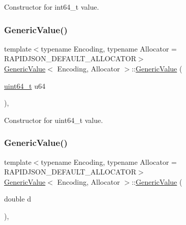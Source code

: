 Constructor for int64\+\_\+t value. 

\mbox{\label{classGenericValue_ad04805a57f5050c8e04be469ba64d6f3}} 
\subsubsection{\texorpdfstring{Generic\+Value()}{GenericValue()}\hspace{0.1cm}{\footnotesize\ttfamily [9/17]}}
{\footnotesize\ttfamily template$<$typename Encoding, typename Allocator = R\+A\+P\+I\+D\+J\+S\+O\+N\+\_\+\+D\+E\+F\+A\+U\+L\+T\+\_\+\+A\+L\+L\+O\+C\+A\+T\+OR$>$ \\
\hyperlink{classGenericValue}{Generic\+Value}$<$ Encoding, Allocator $>$\+::\hyperlink{classGenericValue}{Generic\+Value} (\begin{DoxyParamCaption}\item[{\hyperlink{stdint_8h_aec6fcb673ff035718c238c8c9d544c47}{uint64\+\_\+t}}]{u64 }\end{DoxyParamCaption})\hspace{0.3cm}{\ttfamily [inline]}, {\ttfamily [explicit]}}



Constructor for uint64\+\_\+t value. 

\mbox{\label{classGenericValue_a267d05b7e98c3507908eaf085fe41155}} 
\subsubsection{\texorpdfstring{Generic\+Value()}{GenericValue()}\hspace{0.1cm}{\footnotesize\ttfamily [10/17]}}
{\footnotesize\ttfamily template$<$typename Encoding, typename Allocator = R\+A\+P\+I\+D\+J\+S\+O\+N\+\_\+\+D\+E\+F\+A\+U\+L\+T\+\_\+\+A\+L\+L\+O\+C\+A\+T\+OR$>$ \\
\hyperlink{classGenericValue}{Generic\+Value}$<$ Encoding, Allocator $>$\+::\hyperlink{classGenericValue}{Generic\+Value} (\begin{DoxyParamCaption}\item[{double}]{d }\end{DoxyParamCaption})\hspace{0.3cm}{\ttfamily [inline]}, {\ttfamily [explicit]}}




